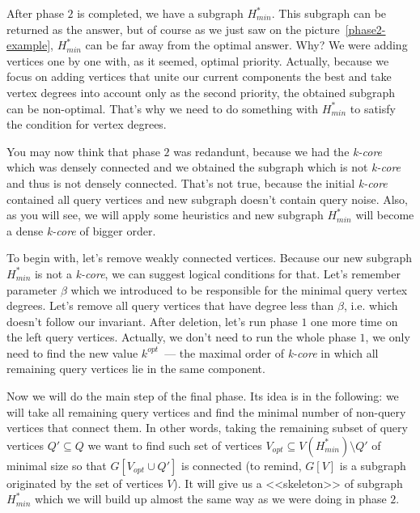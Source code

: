 After phase $2$ is completed, we have a subgraph $H_{min}^*$. This subgraph can be returned as the answer, but of course as we just saw on the picture~\ref{phase2-example}, $H_{min}^*$ can be far away from the optimal answer. Why? We were adding vertices one by one with, as it seemed, optimal priority. Actually, because we focus on adding vertices that unite our current components the best and take vertex degrees into account only as the second priority, the obtained subgraph can be non-optimal. That's why we need to do something with $H_{min}^*$ to satisfy the condition for vertex degrees.

You may now think that phase $2$ was redandunt, because we had the \textit{k-core} which was densely connected and we obtained the subgraph which is not \textit{k-core} and thus is not densely connected. That's not true, because the initial \textit{k-core} contained all query vertices and new subgraph doesn't contain query noise. Also, as you will see, we will apply some heuristics and new subgraph $H_{min}^*$ will become a dense \textit{k-core} of bigger order.

To begin with, let's remove weakly connected vertices. Because our new subgraph $H_{min}^*$ is not a \textit{k-core}, we can suggest logical conditions for that. Let's remember parameter $\beta$ which we introduced to be responsible for the minimal query vertex degrees. Let's remove all query vertices that have degree less than $\beta$, i.e. which doesn't follow our invariant. After deletion, let's run phase $1$ one more time on the left query vertices. Actually, we don't need to run the whole phase $1$, we only need to find the new value $k^{opt}$~--- the maximal order of \textit{k-core} in which all remaining query vertices lie in the same component.

Now we will do the main step of the final phase. Its idea is in the following: we will take all remaining query vertices and find the minimal number of non-query vertices that connect them. In other words, taking the remaining subset of query vertices $Q' \subseteq Q$ we want to find such set of vertices $V_{opt} \subseteq V(H_{min}^*) \setminus Q'$ of minimal size so that $G[V_{opt} \cup Q']$ is connected (to remind, $G[V]$ is a subgraph originated by the set of vertices $V$). It will give us a <<skeleton>> of subgraph $H_{min}^*$ which we will build up almost the same way as we were doing in phase $2$.

